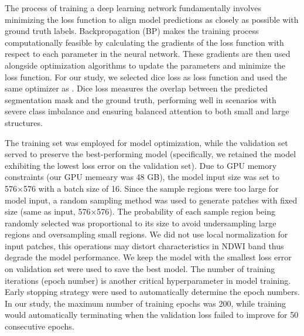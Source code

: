 \documentclass[preprint,12pt,authoryear]{elsarticle}
\begin{document}
The process of training a deep learning network fundamentally involves minimizing the loss function to align model predictions as closely as possible with ground truth labels. Backpropagation (BP) makes the training process computationally feasible by calculating the gradients of the loss function with respect to each parameter in the neural network. These gradients are then used alongside optimization algorithms to update the parameters and minimize the loss function. For our study, we selected dice loss \citep{sudre_generalised_2017} as loss function and used the same optimizer as \citet{pi_mapping_2022}. Dice loss measures the overlap between the predicted segmentation mask and the ground truth, performing well in scenarios with severe class imbalance and ensuring balanced attention to both small and large structures. 

The training set was employed for model optimization, while the validation set served to preserve the best-performing model (specifically, we retained the model exhibiting the lowest loss error on the validation set). Due to GPU memory constraints (our GPU memeary was 48 GB), the model input size was set to 576×576 with a batch size of 16. Since the sample regions were too large for model input, a random sampling method was used to generate patches with fixed size (same as input, 576×576). The probability of each sample region being randomly selected was proportional to its size to avoid undersampling large regions and oversampling small regions. We did not use local normalization for input patches, this operations may distort characteristics in NDWI band thus degrade the model performance. We keep the model with the smallest loss error on validation set were used to save the best model. The number of training iterations (epoch number) is another critical hyperparameter in model training. Early stopping strategy were used to automatically determine the epoch numbers. In our study, the maximum number of training epochs was 200, while training would automatically terminating when the validation loss failed to improve for 50 consecutive epochs.
\end{document}
